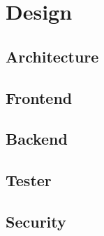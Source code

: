 \chapter{Design}

\section{Architecture}


\section{Frontend}


\section{Backend}


\section{Tester}


\section{Security}

